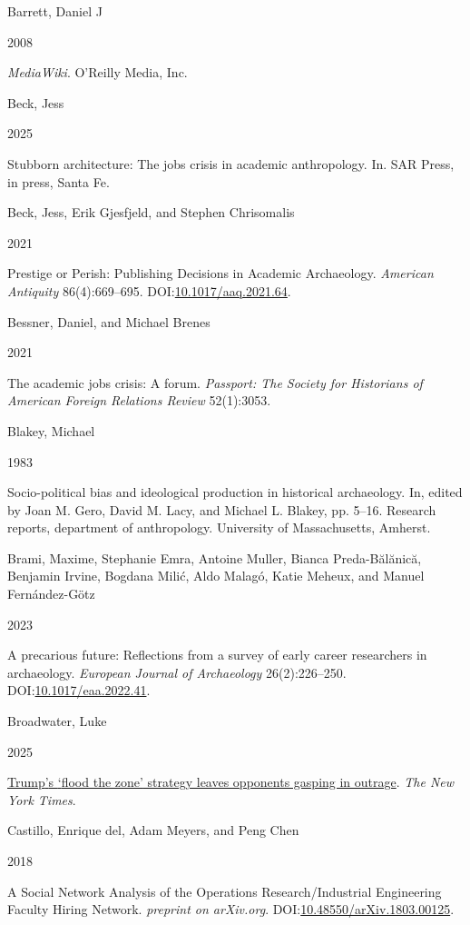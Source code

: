 \documentclass[
  12pt,
]{article}
\newlength{\cslhangindent}
\newlength{\csllabelwidth}
\newenvironment{CSLReferences}[2] %
 {\begin{list}{}{%
  \setlength{\itemindent}{0pt}
  \setlength{\leftmargin}{0pt}
  \setlength{\parsep}{0pt}
  \ifodd #1
   \setlength{\leftmargin}{\cslhangindent}
   \setlength{\itemindent}{-1\cslhangindent}
  \fi
  \setlength{\itemsep}{#2\baselineskip}}}
 {\end{list}}
\newcommand{\CSLBlock}[1]{\hfill\break\parbox[t]{\linewidth}{\strut\ignorespaces#1\strut}}
\newcommand{\CSLLeftMargin}[1]{\parbox[t]{\csllabelwidth}{\strut#1\strut}}
\newcommand{\CSLRightInline}[1]{\parbox[t]{\linewidth - \csllabelwidth}{\strut#1\strut}}
\begin{document}
\begin{CSLReferences}{0}{1}
\CSLBlock{Barrett, Daniel J}
\CSLLeftMargin{ 2008}%
\CSLRightInline{\emph{MediaWiki}. O'Reilly Media, Inc.}

\CSLBlock{Beck, Jess}
\CSLLeftMargin{ 2025}%
\CSLRightInline{Stubborn architecture: The jobs crisis in academic
anthropology. In. SAR Press, in press, Santa Fe.}

\CSLBlock{Beck, Jess, Erik Gjesfjeld, and Stephen Chrisomalis}
\CSLLeftMargin{ 2021}%
\CSLRightInline{Prestige or Perish: Publishing Decisions in Academic
Archaeology. \emph{American Antiquity} 86(4):669--695.
DOI:\href{https://doi.org/10.1017/aaq.2021.64}{10.1017/aaq.2021.64}.}

\CSLBlock{Bessner, Daniel, and Michael Brenes}
\CSLLeftMargin{ 2021}%
\CSLRightInline{The academic jobs crisis: A forum. \emph{Passport: The
Society for Historians of American Foreign Relations Review}
52(1):3053.}

\CSLBlock{Blakey, Michael}
\CSLLeftMargin{ 1983}%
\CSLRightInline{Socio-political bias and ideological production in
historical archaeology. In, edited by Joan M. Gero, David M. Lacy, and
Michael L. Blakey, pp. 5--16. Research reports, department of
anthropology. University of Massachusetts, Amherst.}

\CSLBlock{Brami, Maxime, Stephanie Emra, Antoine Muller, Bianca
Preda-Bălănică, Benjamin Irvine, Bogdana Milić, Aldo Malagó, Katie
Meheux, and Manuel Fernández-Götz}
\CSLLeftMargin{ 2023}%
\CSLRightInline{A precarious future: Reflections from a survey of early
career researchers in archaeology. \emph{European Journal of
Archaeology} 26(2):226--250.
DOI:\href{https://doi.org/10.1017/eaa.2022.41}{10.1017/eaa.2022.41}.}

\CSLBlock{Broadwater, Luke}
\CSLLeftMargin{ 2025}%
\CSLRightInline{\href{https://www.nytimes.com/2025/01/28/us/politics/trump-policy-blitz.html}{Trump{'}s
{`}flood the zone{'} strategy leaves opponents gasping in outrage}.
\emph{The New York Times}.}

\CSLBlock{Castillo, Enrique del, Adam Meyers, and Peng Chen}
\CSLLeftMargin{ 2018}%
\CSLRightInline{A Social Network Analysis of the Operations
Research/Industrial Engineering Faculty Hiring Network. \emph{preprint
on arXiv.org}.
DOI:\href{https://doi.org/10.48550/arXiv.1803.00125}{10.48550/arXiv.1803.00125}.}


\end{CSLReferences}
\end{document}
